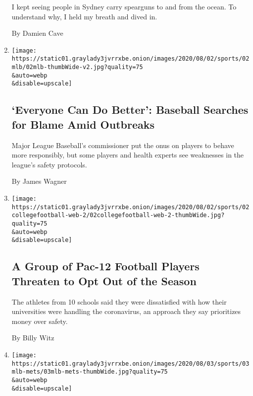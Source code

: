 \begin{enumerate}
  I kept seeing people in Sydney carry spearguns to and from the ocean.
  To understand why, I held my breath and dived in.

  By Damien Cave
\item
  \href{/2020/08/02/sports/baseball/mlb-coronavirus-outbreaks.html}{}

  \texttt{[image: https://static01.graylady3jvrrxbe.onion/images/2020/08/02/sports/02mlb/02mlb-thumbWide-v2.jpg?quality=75\\\&auto=webp\\\&disable=upscale]}

  \hypertarget{everyone-can-do-better-baseball-searches-for-blame-amid-outbreaks}{%
  \subsection{`Everyone Can Do Better': Baseball Searches for Blame Amid
  Outbreaks}\label{everyone-can-do-better-baseball-searches-for-blame-amid-outbreaks}}

  Major League Baseball's commissioner put the onus on players to behave
  more responsibly, but some players and health experts see weaknesses
  in the league's safety protocols.

  By James Wagner
\item
  \href{/2020/08/02/sports/ncaafootball/coronavirus-college-football-pac-12.html}{}

  \texttt{[image: https://static01.graylady3jvrrxbe.onion/images/2020/08/02/sports/02collegefootball-web-2/02collegefootball-web-2-thumbWide.jpg?quality=75\\\&auto=webp\\\&disable=upscale]}

  \hypertarget{a-group-of-pac-12-football-players-threaten-to-opt-out-of-the-season}{%
  \subsection{A Group of Pac-12 Football Players Threaten to Opt Out of
  the
  Season}\label{a-group-of-pac-12-football-players-threaten-to-opt-out-of-the-season}}

  The athletes from 10 schools said they were dissatisfied with how
  their universities were handling the coronavirus, an approach they say
  prioritizes money over safety.

  By Billy Witz
\item
  \href{/2020/08/02/sports/baseball/Yoenis-cespedes-opt-out-rule.html}{}

  \texttt{[image: https://static01.graylady3jvrrxbe.onion/images/2020/08/03/sports/03mlb-mets/03mlb-mets-thumbWide.jpg?quality=75\\\&auto=webp\\\&disable=upscale]}


\end{enumerate}
